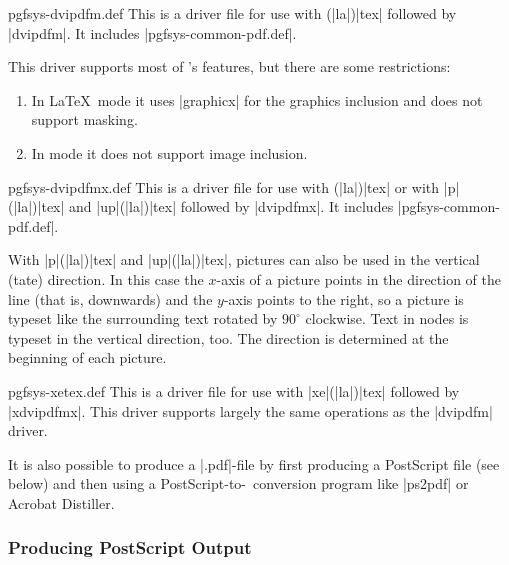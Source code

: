 \begin{filedescription}{pgfsys-dvipdfm.def}
    This is a driver file for use with (|la|)|tex| followed by |dvipdfm|. It
    includes |pgfsys-common-pdf.def|.

    This driver supports most of \pgfname's features, but there are some
    restrictions:
    \begin{enumerate}
        \item In \LaTeX\ mode it uses |graphicx| for the graphics inclusion
            and does not support masking.
        \item In  mode it does not support image inclusion.
    \end{enumerate}
\end{filedescription}

\begin{filedescription}{pgfsys-dvipdfmx.def}
    This is a driver file for use with (|la|)|tex| or with |p|(|la|)|tex| and
    |up|(|la|)|tex| followed by |dvipdfmx|. It includes |pgfsys-common-pdf.def|.

    With |p|(|la|)|tex| and |up|(|la|)|tex|, pictures can also be used in the
    vertical (tate) direction. In this case the $x$-axis of a picture points
    in the direction of the line (that is, downwards) and the $y$-axis points
    to the right, so a picture is typeset like the surrounding text rotated
    by $90^\circ$ clockwise. Text in nodes is typeset in the vertical direction, too.
    The direction is determined at the beginning of each picture.
\end{filedescription}

\begin{filedescription}{pgfsys-xetex.def}
    This is a driver file for use with |xe|(|la|)|tex| followed by |xdvipdfmx|.
    This driver supports largely the same operations as the |dvipdfm| driver.
\end{filedescription}

It is also possible to produce a |.pdf|-file by first producing a PostScript
file (see below) and then using a PostScript-to-\pdf\ conversion program like
|ps2pdf| or Acrobat Distiller.


\subsubsection{Producing PostScript Output}

